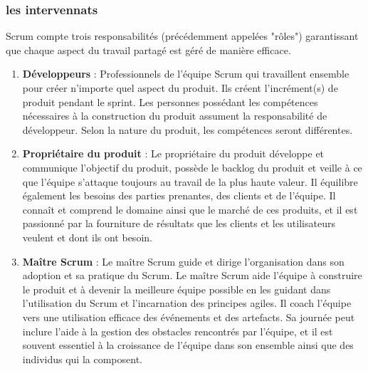 \subsubsection{les intervennats}
Scrum compte trois responsabilités (précédemment appelées "rôles") garantissant que chaque aspect du travail partagé est géré de manière efficace.
\begin{enumerate}
    \item \textbf{Développeurs} : Professionnels de l'équipe Scrum qui travaillent ensemble pour créer n'importe quel aspect du produit. Ils créent l'incrément(s) de produit pendant le sprint. Les personnes possédant les compétences nécessaires à la construction du produit assument la responsabilité de développeur. Selon la nature du produit, les compétences seront différentes. 
    \item \textbf{Propriétaire du produit} : Le propriétaire du produit développe et communique l'objectif du produit, possède le backlog du produit et veille à ce que l'équipe s'attaque toujours au travail de la plus haute valeur. Il équilibre également les besoins des parties prenantes, des clients et de l'équipe. Il connaît et comprend le domaine ainsi que le marché de ces produits, et il est passionné par la fourniture de résultats que les clients et les utilisateurs veulent et dont ils ont besoin.
    \item \textbf{Maître Scrum} : Le maître Scrum guide et dirige l'organisation dans son adoption et sa pratique du Scrum. Le maître Scrum aide l'équipe à construire le produit et à devenir la meilleure équipe possible en les guidant dans l'utilisation du Scrum et l'incarnation des principes agiles. Il coach l'équipe vers une utilisation efficace des événements et des artefacts. Sa journée peut inclure l'aide à la gestion des obstacles rencontrés par l'équipe, et il est souvent essentiel à la croissance de l'équipe dans son ensemble ainsi que des individus qui la composent.
\end{enumerate}

